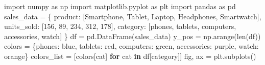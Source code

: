 \documentclass[
  english,
  letterpaper,
  DIV=11,
  numbers=noendperiod]{scrreprt}
\newenvironment{Shaded}{\begin{snugshade}}{\end{snugshade}}
\newcommand{\BuiltInTok}[1]{\textcolor[rgb]{0.00,0.23,0.31}{#1}}
\newcommand{\ControlFlowTok}[1]{\textcolor[rgb]{0.00,0.23,0.31}{\textbf{#1}}}
\newcommand{\DecValTok}[1]{\textcolor[rgb]{0.68,0.00,0.00}{#1}}
\newcommand{\ImportTok}[1]{\textcolor[rgb]{0.00,0.46,0.62}{#1}}
\newcommand{\KeywordTok}[1]{\textcolor[rgb]{0.00,0.23,0.31}{\textbf{#1}}}
\newcommand{\NormalTok}[1]{\textcolor[rgb]{0.00,0.23,0.31}{#1}}
\newcommand{\OperatorTok}[1]{\textcolor[rgb]{0.37,0.37,0.37}{#1}}
\newcommand{\StringTok}[1]{\textcolor[rgb]{0.13,0.47,0.30}{#1}}
\begin{document}
\begin{Shaded}
\begin{Highlighting}[]
\ImportTok{import}\NormalTok{ numpy }\ImportTok{as}\NormalTok{ np}
\ImportTok{import}\NormalTok{ matplotlib.pyplot }\ImportTok{as}\NormalTok{ plt}
\ImportTok{import}\NormalTok{ pandas }\ImportTok{as}\NormalTok{ pd}
\NormalTok{sales\_data }\OperatorTok{=}\NormalTok{ \{}
    \StringTok{\textquotesingle{}product\textquotesingle{}}\NormalTok{: [}\StringTok{\textquotesingle{}Smartphone\textquotesingle{}}\NormalTok{, }\StringTok{\textquotesingle{}Tablet\textquotesingle{}}\NormalTok{, }\StringTok{\textquotesingle{}Laptop\textquotesingle{}}\NormalTok{, }\StringTok{\textquotesingle{}Headphones\textquotesingle{}}\NormalTok{, }\StringTok{\textquotesingle{}Smartwatch\textquotesingle{}}\NormalTok{],}
    \StringTok{\textquotesingle{}units\_sold\textquotesingle{}}\NormalTok{: [}\DecValTok{156}\NormalTok{, }\DecValTok{89}\NormalTok{, }\DecValTok{234}\NormalTok{, }\DecValTok{312}\NormalTok{, }\DecValTok{178}\NormalTok{],}
    \StringTok{\textquotesingle{}category\textquotesingle{}}\NormalTok{: [}\StringTok{\textquotesingle{}phones\textquotesingle{}}\NormalTok{, }\StringTok{\textquotesingle{}tablets\textquotesingle{}}\NormalTok{, }\StringTok{\textquotesingle{}computers\textquotesingle{}}\NormalTok{, }\StringTok{\textquotesingle{}accessories\textquotesingle{}}\NormalTok{, }\StringTok{\textquotesingle{}watch\textquotesingle{}}\NormalTok{]}
\NormalTok{\}}
\NormalTok{df }\OperatorTok{=}\NormalTok{ pd.DataFrame(sales\_data)}
\NormalTok{y\_pos }\OperatorTok{=}\NormalTok{ np.arange(}\BuiltInTok{len}\NormalTok{(df))}
\NormalTok{colors }\OperatorTok{=}\NormalTok{ \{}\StringTok{\textquotesingle{}phones\textquotesingle{}}\NormalTok{: }\StringTok{\textquotesingle{}blue\textquotesingle{}}\NormalTok{, }\StringTok{\textquotesingle{}tablets\textquotesingle{}}\NormalTok{: }\StringTok{\textquotesingle{}red\textquotesingle{}}\NormalTok{, }\StringTok{\textquotesingle{}computers\textquotesingle{}}\NormalTok{: }\StringTok{\textquotesingle{}green\textquotesingle{}}\NormalTok{, }
          \StringTok{\textquotesingle{}accessories\textquotesingle{}}\NormalTok{: }\StringTok{\textquotesingle{}purple\textquotesingle{}}\NormalTok{, }\StringTok{\textquotesingle{}watch\textquotesingle{}}\NormalTok{: }\StringTok{\textquotesingle{}orange\textquotesingle{}}\NormalTok{\}}
\NormalTok{colors\_list }\OperatorTok{=}\NormalTok{ [colors[cat] }\ControlFlowTok{for}\NormalTok{ cat }\KeywordTok{in}\NormalTok{ df[}\StringTok{\textquotesingle{}category\textquotesingle{}}\NormalTok{]]}
\NormalTok{fig, ax }\OperatorTok{=}\NormalTok{ plt.subplots()}

\end{Highlighting}
\end{Shaded}
\end{document}
